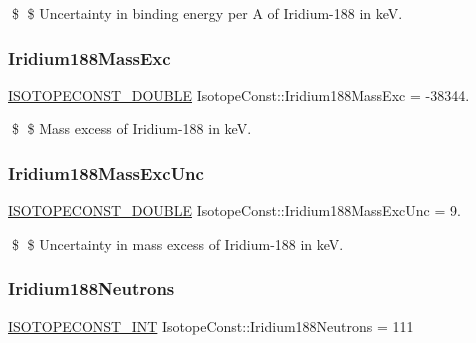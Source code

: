 \$ \$ Uncertainty in binding energy per A of Iridium-\/188 in keV. \mbox{\label{group___isotope_const-_iridium-_ir188_ga952a65ecd2ac9dfe54a74e9f66a39dd4}} 
\subsubsection{\texorpdfstring{Iridium188\+Mass\+Exc}{Iridium188MassExc}}
{\footnotesize\ttfamily \mbox{\hyperlink{group___isotope_const-_macros_ga8f45a7272ce02c0b4c65c44636ed719a}{I\+S\+O\+T\+O\+P\+E\+C\+O\+N\+S\+T\+\_\+\+D\+O\+U\+B\+LE}} Isotope\+Const\+::\+Iridium188\+Mass\+Exc = -\/38344.}

\$ \$ Mass excess of Iridium-\/188 in keV. \mbox{\label{group___isotope_const-_iridium-_ir188_gac77463d929e86779a60e4a16f7e1b4bc}} 
\subsubsection{\texorpdfstring{Iridium188\+Mass\+Exc\+Unc}{Iridium188MassExcUnc}}
{\footnotesize\ttfamily \mbox{\hyperlink{group___isotope_const-_macros_ga8f45a7272ce02c0b4c65c44636ed719a}{I\+S\+O\+T\+O\+P\+E\+C\+O\+N\+S\+T\+\_\+\+D\+O\+U\+B\+LE}} Isotope\+Const\+::\+Iridium188\+Mass\+Exc\+Unc = 9.}

\$ \$ Uncertainty in mass excess of Iridium-\/188 in keV. \mbox{\label{group___isotope_const-_iridium-_ir188_ga0fd2c5bdacdd5f46c05f24bc8b04afeb}} 
\subsubsection{\texorpdfstring{Iridium188\+Neutrons}{Iridium188Neutrons}}
{\footnotesize\ttfamily \mbox{\hyperlink{group___isotope_const-_macros_ga5f18360b3e99483a35c32d789e62621c}{I\+S\+O\+T\+O\+P\+E\+C\+O\+N\+S\+T\+\_\+\+I\+NT}} Isotope\+Const\+::\+Iridium188\+Neutrons = 111}

